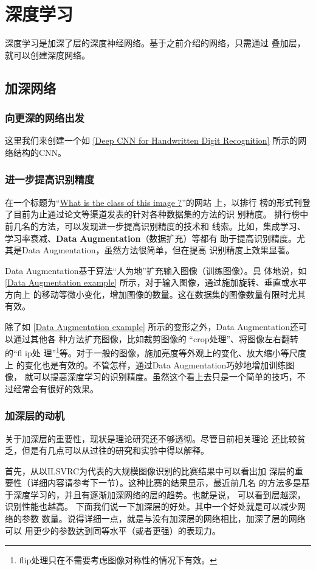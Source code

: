\chapter{深度学习}
深度学习是加深了层的深度神经网络。基于之前介绍的网络，只需通过
叠加层，就可以创建深度网络。
\section{加深网络}

\subsection{向更深的网络出发}

这里我们来创建一个如 \autoref{Deep CNN for Handwritten Digit Recognition} 所示的网络结构的CNN。


\subsection{进一步提高识别精度}
在一个标题为“\href{https://rodrigob.github.io/are_we_there_yet/build/classification_datasets_results.html}{What is the class of this image ?}”的网站
上，以排行
榜的形式刊登了目前为止通过论文等渠道发表的针对各种数据集的方法的识
别精度。
排行榜中前几名的方法，可以发现进一步提高识别精度的技术和
线索。比如，集成学习、学习率衰减、\textbf{Data Augmentation}（数据扩充）等都有
助于提高识别精度。尤其是Data Augmentation，虽然方法很简单，但在提高
识别精度上效果显著。

Data Augmentation基于算法“人为地”扩充输入图像（训练图像）。具
体地说，如 \autoref{Data Augmentation example} 所示，对于输入图像，通过施加旋转、垂直或水平方向上
的移动等微小变化，增加图像的数量。这在数据集的图像数量有限时尤其有效。

除了如 \autoref{Data Augmentation example} 所示的变形之外，Data Augmentation还可以通过其他各
种方法扩充图像，比如裁剪图像的 “crop处理”、将图像左右翻转的“fl ip处
理”\footnote{flip处理只在不需要考虑图像对称性的情况下有效。}等。对于一般的图像，施加亮度等外观上的变化、放大缩小等尺度上
的变化也是有效的。不管怎样，通过Data Augmentation巧妙地增加训练图像，
就可以提高深度学习的识别精度。虽然这个看上去只是一个简单的技巧，不
过经常会有很好的效果。


\subsection{加深层的动机}
关于加深层的重要性，现状是理论研究还不够透彻。尽管目前相关理论
还比较贫乏，但是有几点可以从过往的研究和实验中得以解释。

首先，从以ILSVRC为代表的大规模图像识别的比赛结果中可以看出加
深层的重要性（详细内容请参考下一节）。这种比赛的结果显示，最近前几名
的方法多是基于深度学习的，并且有逐渐加深网络的层的趋势。也就是说，
可以看到层越深，识别性能也越高。
下面我们说一下加深层的好处。其中一个好处就是可以减少网络的参数
数量。说得详细一点，就是与没有加深层的网络相比，加深了层的网络可以
用更少的参数达到同等水平（或者更强）的表现力。